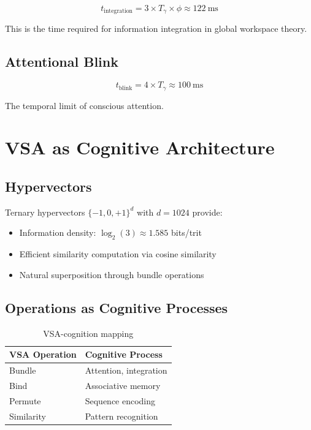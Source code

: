 \documentclass[12pt,a4paper]{article}
\begin{document}
\begin{equation}
t_{\text{integration}} = 3 \times T_\gamma \times \phi \approx 122~\text{ms}
\end{equation}

This is the time required for information integration in global workspace theory.

\subsection{Attentional Blink}

\begin{equation}
t_{\text{blink}} = 4 \times T_\gamma \approx 100~\text{ms}
\end{equation}

The temporal limit of conscious attention.

\section{VSA as Cognitive Architecture}

\subsection{Hypervectors}

Ternary hypervectors $\{-1, 0, +1\}^d$ with $d = 1024$ provide:
\begin{itemize}
\item Information density: $\log_2(3) \approx 1.585$ bits/trit
\item Efficient similarity computation via cosine similarity
\item Natural superposition through bundle operations
\end{itemize}

\subsection{Operations as Cognitive Processes}

\begin{table}[h]
\centering
\begin{tabular}{ll}
\toprule
VSA Operation & Cognitive Process \\
\midrule
Bundle & Attention, integration \\
Bind & Associative memory \\
Permute & Sequence encoding \\
Similarity & Pattern recognition \\
\bottomrule
\end{tabular}
\caption{VSA-cognition mapping}
\end{table}
\end{document}
